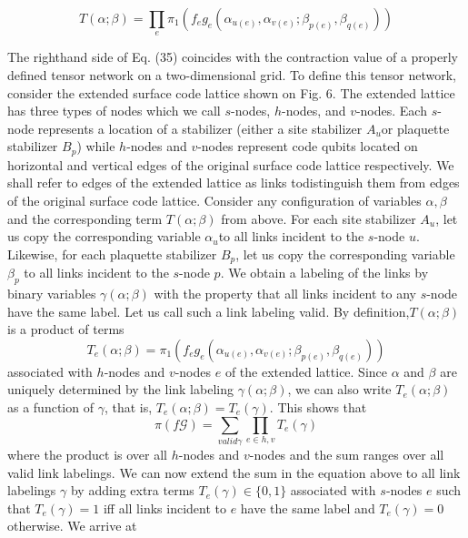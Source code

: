 \begin{equation*}
    T(\alpha; \beta) = \prod_{e} \pi_1 ( f_e g_e (\alpha_{u(e)}, \alpha_{v(e)}; \beta_{p(e)}, \beta_{q(e)} ))
\end{equation*}

The righthand side of Eq. (35) coincides with the contraction value of a properly defined tensor network on a two-dimensional grid. To define this tensor network, consider the extended surface code lattice shown on Fig. 6. The extended lattice has three types of nodes which we call \(s\)-nodes, \(h\)-nodes, and \(v\)-nodes. Each \(s\)-node represents a location of a stabilizer (either a site stabilizer \(A_u\)or  plaquette  stabilizer \(B_p\))  while \(h\)-nodes  and \(v\)-nodes represent code qubits located on horizontal and vertical edges of the original surface code lattice respectively. We shall refer to edges of the extended lattice as links todistinguish them from edges of the original surface code lattice.
Consider  any  configuration  of  variables \(\alpha, \beta\) and  the corresponding  term \(T(\alpha; \beta)\) from above. For each site stabilizer \(A_u\), let us copy the corresponding variable \(\alpha_u\)to all links incident to the \(s\)-node \(u\). Likewise, for each plaquette stabilizer \(B_p\), let us copy the corresponding variable \(\beta_p\) to all links incident to the \(s\)-node \(p\).  We obtain a labeling of the links by binary variables \(\gamma(\alpha; \beta)\)  with the property that all links incident to any \(s\)-node have the same label. Let us call such a link labeling valid.  By definition,\(T(\alpha; \beta)\) is a product of terms
\begin{equation*}
    T_e(\alpha; \beta) = \pi_1 ( f_e g_e (\alpha_{u(e)}, \alpha_{v(e)}; \beta_{p(e)}, \beta_{q(e)} ))
\end{equation*}
associated with \(h\)-nodes and \(v\)-nodes \(e\) of the extended lattice. Since \(\alpha\) and \(\beta\) are uniquely determined by the link labeling \(\gamma(\alpha; \beta)\), we can also write \(T_e(\alpha; \beta)\) as a function of \(\gamma\), that is, \(T_e(\alpha; \beta) = T_e(\gamma)\). This shows that
\begin{equation*}
    \pi(f\mathcal{G}) = \sum_{ valid \gamma} \prod_{e \in h,v} T_e(\gamma)
\end{equation*}
where the product is over all \(h\)-nodes and \(v\)-nodes and the sum ranges over all valid link labelings. We can now extend the sum in the equation above to all link labelings \(\mathcal{\gamma}\) by adding extra terms \(T_e(\gamma) \in \{0,1\}\) associated with \(s\)-nodes \(e\) such that \(T_e(\gamma) =1\) iff all links incident to \(e\) have the same label and \(T_e(\gamma) = 0\) otherwise. We arrive at
